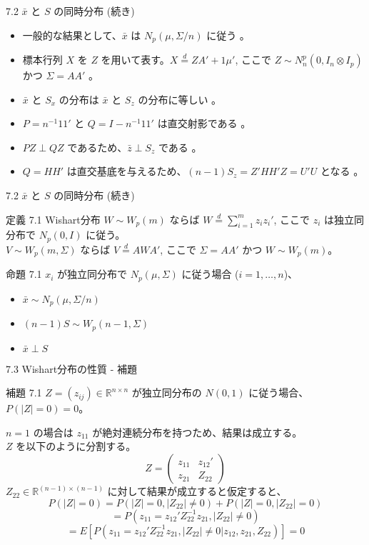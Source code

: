 \documentclass[aspectratio=169]{beamer}
\begin{document}
\begin{frame}{7.2 $\bar{x}$ と $S$ の同時分布 (続き)}
\begin{itemize}
    \item 一般的な結果として、$\bar{x}$ は $N_p(\mu, \Sigma/n)$ に従う 。
    \item 標本行列 $X$ を $Z$ を用いて表す。$X \overset{d}{=} ZA' + 1\mu'$, ここで $Z \sim N_n^p(0, I_n \otimes I_p)$ かつ $\Sigma=AA'$ 。
    \item $\bar{x}$ と $S_x$ の分布は $\bar{x}$ と $S_z$ の分布に等しい 。
    \item $P=n^{-1}11'$ と $Q=I-n^{-1}11'$ は直交射影である 。
    \item $PZ \perp QZ$ であるため、$\bar{z} \perp S_z$ である 。
    \item $Q=HH'$ は直交基底を与えるため、$(n-1)S_z = Z'HH'Z = U'U$ となる 。
\end{itemize}
\end{frame}

\begin{frame}{7.2 $\bar{x}$ と $S$ の同時分布 (続き)}
\begin{block}{定義 7.1 Wishart分布}
$W \sim W_p(m)$ ならば $W \overset{d}{=} \sum_{i=1}^{m} z_i z_i'$, ここで $z_i$ は独立同分布で $N_p(0, I)$ に従う。\\
$V \sim W_p(m, \Sigma)$ ならば $V \overset{d}{=} AWA'$, ここで $\Sigma=AA'$ かつ $W \sim W_p(m)$。
\end{block}

\begin{block}{命題 7.1}
$x_i$ が独立同分布で $N_p(\mu, \Sigma)$ に従う場合 ($i=1, \dots, n$)、
\begin{itemize}
    \item $\bar{x} \sim N_p(\mu, \Sigma/n)$ 
    \item $(n-1)S \sim W_p(n-1, \Sigma)$ 
    \item $\bar{x} \perp S$ 
\end{itemize}
\end{block}
\end{frame}

\begin{frame}{7.3 Wishart分布の性質 - 補題}
\begin{block}{補題 7.1}
$Z = (z_{ij}) \in \mathbb{R}^{n \times n}$ が独立同分布の $N(0, 1)$ に従う場合、$P(|Z| = 0) = 0$。
\end{block}

$n=1$ の場合は $z_{11}$ が絶対連続分布を持つため、結果は成立する。\\
$Z$ を以下のように分割する。
\[
Z = \begin{pmatrix} z_{11} & z_{12}' \\ z_{21} & Z_{22} \end{pmatrix}
\]
$Z_{22} \in \mathbb{R}^{(n-1) \times (n-1)}$ に対して結果が成立すると仮定すると、
\[
P(|Z|=0) = P(|Z|=0, |Z_{22}| \ne 0) + P(|Z|=0, |Z_{22}|=0)
\]
\[
= P(z_{11} = z_{12}'Z_{22}^{-1}z_{21}, |Z_{22}| \ne 0)
\]
\[
= E[P(z_{11} = z_{12}'Z_{22}^{-1}z_{21}, |Z_{22}| \ne 0 | z_{12}, z_{21}, Z_{22})] = 0
\]
\end{frame}
\end{document}
